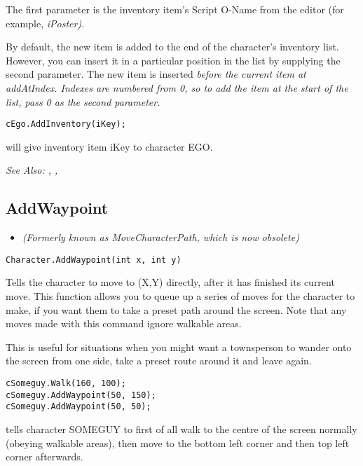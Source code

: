 The first parameter is the inventory item's Script O-Name from the editor (for
example, \it{iPoster}).

By default, the new item is added to the end of the character's inventory list. However,
you can insert it in a particular position in the list by supplying the second parameter.
The new item is inserted \it{before} the current item at \it{addAtIndex}. Indexes are
numbered from 0, so to add the item at the start of the list, pass 0 as the second parameter.

\begin{verbatim}
cEgo.AddInventory(iKey);
\end{verbatim}
will give inventory item iKey to character EGO.

\it{See Also:} ,
,


\subsection{AddWaypoint}\label{Character.AddWaypoint}%

\begin{itemize}
\item \it{(Formerly known as MoveCharacterPath, which is now obsolete)}
\end{itemize}

\begin{verbatim}
Character.AddWaypoint(int x, int y)
\end{verbatim}
Tells the character to move to (X,Y) directly, after it has finished its current
move. This function allows you to queue up a series of moves for the character to make, if
you want them to take a preset path around the screen. Note that any moves made with
this command ignore walkable areas.

This is useful for situations when you might want a townsperson to wander onto the screen
from one side, take a preset route around it and leave again.

\begin{verbatim}
cSomeguy.Walk(160, 100);
cSomeguy.AddWaypoint(50, 150);
cSomeguy.AddWaypoint(50, 50);
\end{verbatim}
tells character SOMEGUY to first of all walk to the centre of the screen normally (obeying
walkable areas), then move to the bottom left corner and then top left corner afterwards.


